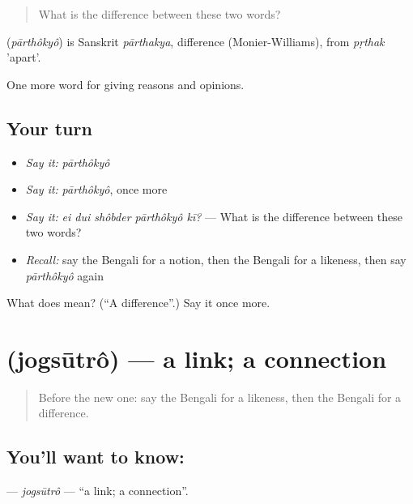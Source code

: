 \begin{quote}
What is the difference between these two words?
\end{quote}

\begin{cousinweb}
\textbf{} (\emph{pārthôkyô}) is Sanskrit \emph{pārthakya}, difference (Monier-Williams), from \emph{pṛthak} 'apart'.
\end{cousinweb}

\begin{grammarlens}[title={What you've built}]
One more word for giving reasons and opinions.
\end{grammarlens}

\subsection*{Your turn}
\begin{itemize}
\raggedright
  \item \emph{Say it:} \emph{pārthôkyô}
  \item \emph{Say it:} \emph{pārthôkyô}, once more
  \item \emph{Say it:} \emph{ei dui shôbder pārthôkyô kī?} — What is the difference between these two words?
  \item \emph{Recall:} say the Bengali for a notion, then the Bengali for a likeness, then say \emph{pārthôkyô} again
\end{itemize}

\begin{tcolorbox}[breakable,colback=teal!4,colframe=teal!35!black,title={Before you move on}]
What does  mean? (\textquotedblleft{}A difference\textquotedblright{}.) Say it once more.
\end{tcolorbox}
\section[\texorpdfstring{\bn{যোগসূত্র} (jogsūtrô)}{যোগসূত্র (jogsūtrô)}]{ (jogsūtrô) — a link; a connection}

\label{lesson:BN-C358-jogsutro}



\begin{quote}
Before the new one: say the Bengali for a likeness, then the Bengali for a difference.
\end{quote}

\subsection*{You'll want to know: }
\textbf{} — \emph{jogsūtrô} — \textquotedblleft{}a link; a connection\textquotedblright{}.

